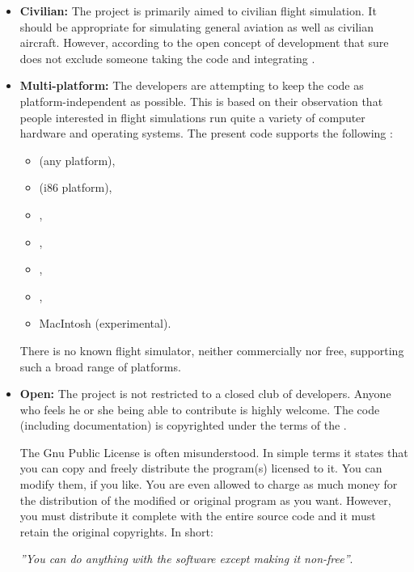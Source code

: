 \begin{itemize}
 \item \textbf{Civilian:} The
 project is primarily aimed to civilian flight simulation.
 It should be appropriate for simulating
 general aviation as well as civilian aircraft. However, according to
 the open concept of development that sure does not exclude someone
 taking the code and integrating .

 \item\textbf{Multi-platform:} The
 developers are attempting to keep the code as platform-independent
 as possible. This is based on their observation that
 people interested in flight simulations run quite
  a variety of computer hardware and operating systems. The present code
  supports the following :
  \begin{itemize}
  \item{} (any platform),
  \item{} (i86 platform),
  \item{},
  \item{},
  \item{},
  \item{},
  \item{MacIntosh (experimental).}
  \end{itemize}

There is no known flight simulator, neither commercially nor free, supporting such a
broad range of platforms.

  \item\textbf{Open:} The project is not
  restricted to a closed club of developers. Anyone who feels he or she
  being able to contribute is highly welcome.
  The code (including documentation) is copyrighted under the
  terms of the .

  The Gnu Public License is often misunderstood. In simple terms it
  states that you can copy and freely distribute the program(s) licensed
  to it. You can modify them, if you like. You are even allowed to charge
  as much money for the distribution of the modified or original program as you want.
  However, you must distribute it complete with the entire source code
  and it must retain the original copyrights. In short:
\medskip

\centerline{\textit{''You can do anything with the software except
making it non-free''}.}


\end{itemize}
